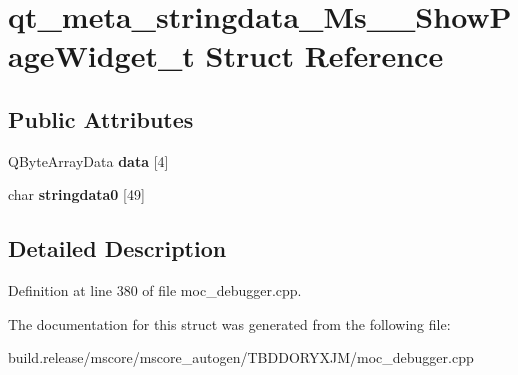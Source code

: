 \hypertarget{structqt__meta__stringdata___ms_____show_page_widget__t}{}\section{qt\+\_\+meta\+\_\+stringdata\+\_\+\+Ms\+\_\+\+\_\+\+Show\+Page\+Widget\+\_\+t Struct Reference}
\label{structqt__meta__stringdata___ms_____show_page_widget__t}
\subsection*{Public Attributes}
\begin{DoxyCompactItemize}
\item 
\mbox{\label{structqt__meta__stringdata___ms_____show_page_widget__t_a8bdc524a7c31069fda34114cd7db83e6}} 
Q\+Byte\+Array\+Data {\bfseries data} \mbox{[}4\mbox{]}
\item 
\mbox{\label{structqt__meta__stringdata___ms_____show_page_widget__t_a1e83c015a5cd6fa520cf6334cea3b7fd}} 
char {\bfseries stringdata0} \mbox{[}49\mbox{]}
\end{DoxyCompactItemize}


\subsection{Detailed Description}


Definition at line 380 of file moc\+\_\+debugger.\+cpp.



The documentation for this struct was generated from the following file\+:\begin{DoxyCompactItemize}
\item 
build.\+release/mscore/mscore\+\_\+autogen/\+T\+B\+D\+D\+O\+R\+Y\+X\+J\+M/moc\+\_\+debugger.\+cpp\end{DoxyCompactItemize}
